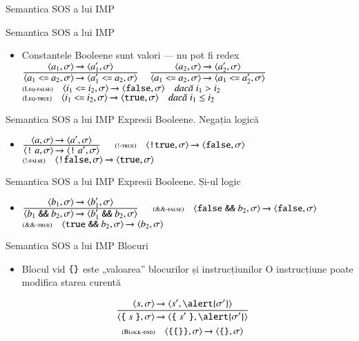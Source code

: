 \documentclass[xcolor=pdftex,romanian,colorlinks]{beamer}
\begin{document}
\begin{section}{Semantica SOS a lui IMP}
\begin{frame}{Semantica SOS a lui IMP}
\begin{itemize}
  \item Constantele Booleene sunt valori --- nu pot fi redex
  \vitem[] $\reg{\Ss{\c{a_1 \terminal{<=} a_2,\sigma}}{\c{a_1' \terminal{<=} a_2,\sigma}}}{\Ss{\c{a_1,\sigma}}{\c{a_1',\sigma}}}{}$\hfill$\reg{\Ss{\c{a_1 \terminal{<=} a_2,\sigma}}{\c{a_1 \terminal{<=} a_2',\sigma}}}{\Ss{\c{a_2,\sigma}}{\c{a_2',\sigma}}}{}$
  \vitem[] $\reg[Leq-false]{\Ss{\c{i_1 \terminal{<=} i_2,\sigma}}{\c{\terminal{false},\sigma}}}{}{i_1 > i_2}$
  \vitem[] $\reg[Leq-true]{\Ss{\c{i_1 \terminal{<=} i_2,\sigma}}{\c{\terminal{true},\sigma}}}{}{i_1 \leq i_2}$
  \end{itemize}
  \end{frame}
  \begin{frame}{Semantica SOS a lui IMP}
  {Expresii Booleene. Negația logică}
  \begin{itemize}
  \item[] $\reg{\Ss{\c{\terminal{!} a,\sigma}}{\c{\terminal{!} a',\sigma}}}{\Ss{\c{a,\sigma}}{\c{a',\sigma}}}{}$
  \vitem[] $\reg[!-true]{\Ss{\c{\terminal{!} \terminal{true},\sigma}}{\c{\terminal{false},\sigma}}}{}{}$
  \vitem[] $\reg[!-false]{\Ss{\c{\terminal{!} \terminal{false},\sigma}}{\c{\terminal{true},\sigma}}}{}{}$
  \end{itemize}
  \end{frame}
  \begin{frame}{Semantica SOS a lui IMP}
  {Expresii Booleene. Și-ul logic}
  \begin{itemize}
  \item[] $\reg{\Ss{\c{b_1 \terminal{\&\&} b_2,\sigma}}{\c{b_1' \terminal{\&\&} b_2,\sigma}}}{\Ss{\c{b_1,\sigma}}{\c{b_1',\sigma}}}{}$
  \vitem[] $\reg[\&\&-false]{\Ss{\c{\terminal{false}\; \terminal{\&\&} b_2,\sigma}}{\c{\terminal{false},\sigma}}}{}{}$
  \vitem[] $\reg[\&\&-true]{\Ss{\c{\terminal{true}\; \terminal{\&\&} b_2,\sigma}}{\c{b_2,\sigma}}}{}{}$
  \end{itemize}
  \end{frame}
  \begin{frame}{Semantica SOS a lui IMP}
  {Blocuri}
  \begin{itemize}
  \item Blocul vid $\mathrel{\text{\ttfamily \{\}}}$ este „valoarea” blocurilor și instrucțiunilor
  \vitem O instrucțiune poate modifica starea curentă

  \[\reg{\Ss{\c{\terminal{\{} s \terminal{\}},\sigma}}{\c{\terminal{\{} s' \terminal{\}},\alert{\sigma'}}}}{\Ss{\c{s,\sigma}}{\c{s',\alert{\sigma'}}}}{}\]
  \vitem[] \[\reg[Block-end]{\Ss{\c{\terminal{\{} \terminal{\{\}} \terminal{\}},\sigma}}{\c{\terminal{\{\}},\sigma}}}{}{}\]
  \end{itemize}
  \end{frame}


\end{section}
\end{document}

